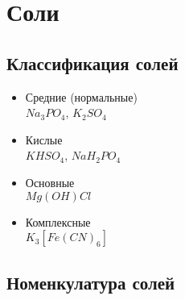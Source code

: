 \newpage
\section{Соли}
\subsection{Классификация солей}
\begin{itemize}
    \item Средние (нормальные)\\
        $Na_3PO_4$, $K_2SO_4$

    \item Кислые\\
        $KHSO_4$, $NaH_2PO_4$

    \item Основные\\
        $Mg(OH)Cl$

    \item Комплексные\\
        $K_3[Fe(CN)_6]$

\end{itemize}


\subsection{Номенкулатура солей}
\noindent
{}\\
\\
\\
\\


